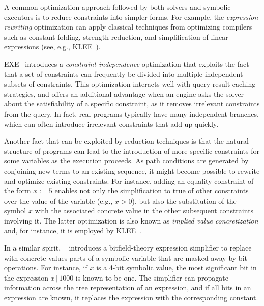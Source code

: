 
A common optimization approach followed by both solvers and symbolic executors is to reduce constraints into simpler forms. For example, the {\em expression rewriting} optimization can apply classical techniques from optimizing compilers such as constant folding, strength reduction, and simplification of linear expressions (see, e.g., {\sc KLEE}~\cite{KLEE-OSDI08}).

{\sc EXE}~\cite{EXE-CCS06} introduces a {\em constraint independence} optimization that exploits the fact that a set of constraints can frequently be divided into multiple independent subsets of constraints. This optimization interacts well with query result caching strategies, and offers an additional advantage when an engine asks the solver about the satisfiability of a specific constraint, as it removes irrelevant constraints from the query. In fact, real programs typically have many independent branches, which can often introduce irrelevant constraints that add up quickly.

Another fact that can be exploited by reduction techniques is that the natural structure of programs can lead to the introduction of more specific constraints for some variables as the execution proceeds. As path conditions are generated by conjoining new terms to an existing sequence, it might become possible to rewrite and optimize existing constraints. For instance, adding an equality constraint of the form $x:=5$ enables not only the simplification to true of other constraints over the value of the variable (e.g., $x>0$), but also the substitution of the symbol $x$ with the associated concrete value in the other subsequent constraints involving it. The latter optimization is also known as {\em implied value concretization} and, for instance, it is employed by {\sc KLEE}~\cite{KLEE-OSDI08}.

In a similar spirit, {\sc \stwoe}~\cite{CKC-TOCS12} introduces a bitfield-theory expression simplifier to replace with concrete values parts of a symbolic variable that are masked away by bit operations. For instance, if $x$ is a 4-bit symbolic value, the most significant bit in the expression $x\,|\,1000$ is known to be one. The simplifier can propagate information across the tree representation of an expression, and if all bits in an expression are known, it replaces the expression with the corresponding constant.
 
